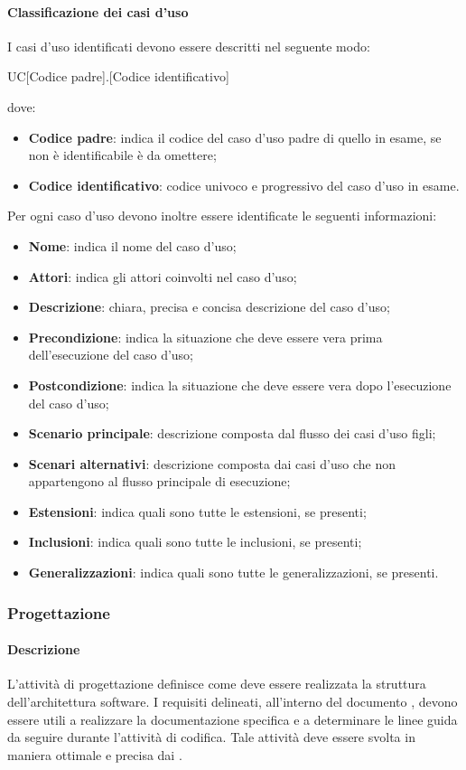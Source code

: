 \paragraph{Classificazione dei casi d'uso}
I casi d'uso identificati devono essere descritti nel seguente modo:
\begin{center}
  UC[Codice padre].[Codice identificativo]
\end{center}
dove:
\begin{itemize}
  \item\textbf{Codice padre}: indica il codice del caso d'uso padre di quello in
  esame, se non è identificabile è da omettere;
  \item\textbf{Codice identificativo}: codice univoco e progressivo del caso d'uso in esame.
\end{itemize}
Per ogni caso d'uso devono inoltre essere identificate le seguenti informazioni:
\begin{itemize}
  \item\textbf{Nome}: indica il nome del caso d'uso;
  \item\textbf{Attori}: indica gli attori coinvolti nel caso d'uso;
  \item\textbf{Descrizione}: chiara, precisa e concisa descrizione del caso
  d'uso;
  \item\textbf{Precondizione}: indica la situazione che deve essere vera prima
  dell'esecuzione del caso d'uso;
  \item\textbf{Postcondizione}: indica la situazione che deve essere vera dopo
  l'esecuzione del caso d'uso;
  \item\textbf{Scenario principale}: descrizione composta dal flusso dei casi d'uso
  figli;
  \item\textbf{Scenari alternativi}: descrizione composta dai casi d'uso che non
  appartengono al flusso principale di esecuzione;
  \item\textbf{Estensioni}: indica quali sono tutte le estensioni, se presenti;
  \item\textbf{Inclusioni}: indica quali sono tutte le inclusioni, se presenti;
  \item\textbf{Generalizzazioni}: indica quali sono tutte le generalizzazioni,
  se presenti.
\end{itemize}
\subsubsection{Progettazione}

\paragraph{Descrizione}
L'attività di progettazione definisce come deve essere realizzata la struttura dell'architettura software. I requisiti delineati, all'interno del documento \textit{\AdR}, devono essere utili a realizzare la documentazione specifica e a determinare le linee guida da seguire durante l'attività di codifica.
Tale attività deve essere svolta in maniera ottimale e precisa dai \textit{\Progs}.

